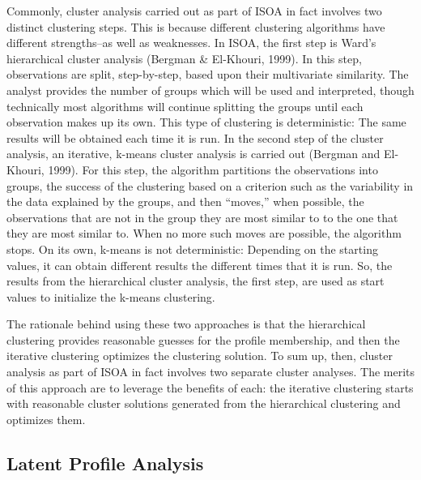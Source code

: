\documentclass[man]{apa6}
\begin{document}
Commonly, cluster analysis carried out as part of ISOA in fact involves
two distinct clustering steps. This is because different clustering
algorithms have different strengths--as well as weaknesses. In ISOA, the
first step is Ward's hierarchical cluster analysis (Bergman \&
El-Khouri, 1999). In this step, observations are split, step-by-step,
based upon their multivariate similarity. The analyst provides the
number of groups which will be used and interpreted, though technically
most algorithms will continue splitting the groups until each
observation makes up its own. This type of clustering is deterministic:
The same results will be obtained each time it is run. In the second
step of the cluster analysis, an iterative, k-means cluster analysis is
carried out (Bergman and El-Khouri, 1999). For this step, the algorithm
partitions the observations into groups, the success of the clustering
based on a criterion such as the variability in the data explained by
the groups, and then \enquote{moves,} when possible, the observations
that are not in the group they are most similar to to the one that they
are most similar to. When no more such moves are possible, the algorithm
stops. On its own, k-means is not deterministic: Depending on the
starting values, it can obtain different results the different times
that it is run. So, the results from the hierarchical cluster analysis,
the first step, are used as start values to initialize the k-means
clustering.

The rationale behind using these two approaches is that the hierarchical
clustering provides reasonable guesses for the profile membership, and
then the iterative clustering optimizes the clustering solution. To sum
up, then, cluster analysis as part of ISOA in fact involves two separate
cluster analyses. The merits of this approach are to leverage the
benefits of each: the iterative clustering starts with reasonable
cluster solutions generated from the hierarchical clustering and
optimizes them.

\subsection{Latent Profile Analysis}\label{latent-profile-analysis}
\end{document}
